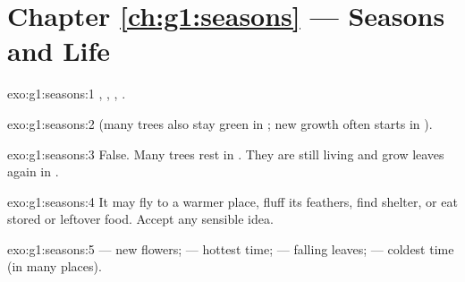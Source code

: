 \section*{Chapter \ref{ch:g1:seasons} --- Seasons and Life}

\begin{solution}{exo:g1:seasons:1}
, , , .
\end{solution}

\begin{solution}{exo:g1:seasons:2}
 (many trees also stay green in ; new growth often
starts in ).
\end{solution}

\begin{solution}{exo:g1:seasons:3}
False. Many trees rest in . They are still living and grow
leaves again in .
\end{solution}

\begin{solution}{exo:g1:seasons:4}
It may fly to a warmer place, fluff its feathers, find shelter, or
eat stored or leftover food. Accept any sensible idea.
\end{solution}

\begin{solution}{exo:g1:seasons:5}
 --- new flowers;  --- hottest time;  --- falling
leaves;  --- coldest time (in many places).
\end{solution}

